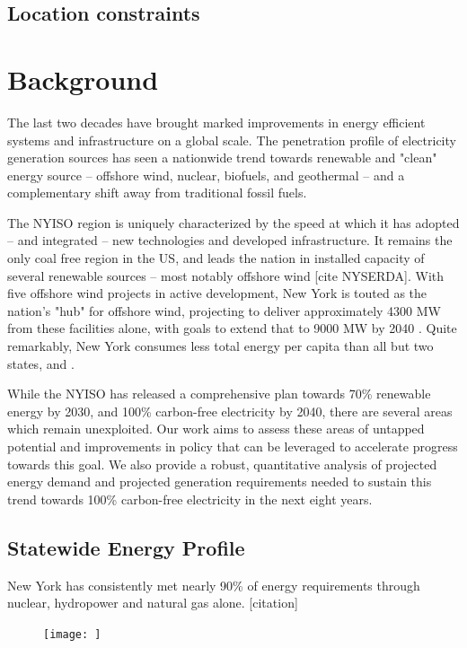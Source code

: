 \documentclass[plain]{article}
\newcommand{\1}{\mathbbm{1}}
\begin{document}
\subsection{Location constraints}
\section{Background}
The last two decades have brought marked improvements in energy efficient systems and infrastructure on a global scale. The penetration profile of electricity generation sources has seen a nationwide trend towards renewable and "clean" energy source -- offshore wind, nuclear, biofuels, and geothermal -- and a complementary shift away from traditional fossil fuels. 

The NYISO region is uniquely characterized by the speed at which it has adopted -- and integrated -- new technologies and developed infrastructure. It remains the only coal free region in the US, and leads the nation in installed capacity of several renewable sources -- most notably offshore wind [cite NYSERDA]. With five offshore wind projects in active development, New York is touted as the nation's "hub" for offshore wind, projecting to deliver approximately 4300 MW from these facilities alone, with goals to extend that to 9000 MW by 2040 . Quite remarkably, New York consumes less total energy per capita than all but two states, and .

While the NYISO has released a comprehensive plan towards 70\% renewable energy by 2030, and 100\% carbon-free electricity by 2040, 
there are several areas which remain unexploited. Our work aims to assess these areas of untapped potential and improvements in policy that can be leveraged to accelerate progress towards this goal. We also provide a robust, quantitative analysis of projected energy demand and projected generation requirements needed to sustain this trend towards 100\% carbon-free electricity in the next eight years.

\subsection{Statewide Energy Profile}
New York has consistently met nearly 90\% of energy requirements through nuclear, hydropower and natural gas alone. [citation] 

\begin{figure}[H]
	\centering
	\texttt{[image: ]}
	\caption{}
	\label{fig:}
\end{figure}
\end{document}
